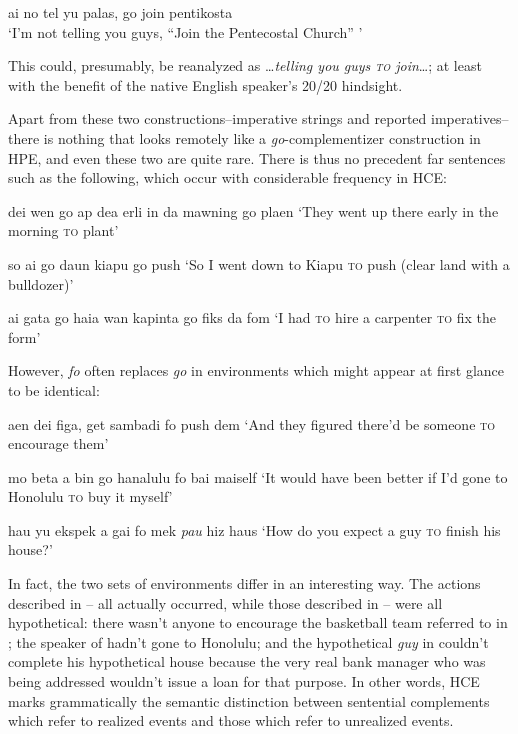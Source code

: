 \ea\label{ex:60}
 ai no tel yu palas, go join pentikosta\\
\glt `I'm not telling you guys, ``Join the Pentecostal Church'' '
\z

\noindent This could, presumably, be reanalyzed as \ldots \textit{telling you guys \textsc{to} join}\ldots; at least with the benefit of the native English speaker's 20/20 hindsight.

Apart from these two constructions--imperative strings and reported imperatives--there is nothing that looks remotely like a \textit{go}-complementizer construction in HPE, and even these two are quite rare. There is thus no precedent far sentences such as the following, which occur with considerable frequency in HCE:

\ea\label{ex:61}
 dei wen go ap dea erli in da mawning go plaen
\glt `They went up there early in the morning \textsc{to} plant'
\z

\ea\label{ex:62}
 so ai go daun kiapu go push
\glt `So I went down to Kiapu \textsc{to} push (clear land with a bulldozer)'
\z

\ea\label{ex:63}
 ai gata go haia wan kapinta go fiks da fom
\glt `I had \textsc{to} hire a carpenter \textsc{to} fix the form'
\z

However, \textit{fo} often replaces \textit{go} in environments which might appear at first glance to be identical:

\ea\label{ex:64}
 aen dei figa, get sambadi fo push dem
\glt `And they figured there'd be someone \textsc{to} encourage them'
\z

\ea\label{ex:65}
 mo beta a bin go hanalulu fo bai maiself
\glt `It would have been better if I'd gone to Honolulu \textsc{to} buy it myself' 
\z

\ea\label{ex:66}
 hau yu ekspek a gai fo mek \textit{pau} hiz haus
\glt `How do you expect a guy \textsc{to} finish his house?'
\z

\noindent In fact, the two sets of environments differ in an interesting way. The actions described in -- all actually occurred, while those de\-scribed in -- were all hypothetical: there wasn't anyone to encourage the basketball team referred to in ; the speaker of  hadn't gone to Honolulu; and the hypothetical \textit{guy} in  couldn't complete his hypothetical house because the very real bank manager who was being addressed wouldn't issue a loan for that purpose. In
other words, HCE marks grammatically the semantic distinction be\-tween sentential complements which refer to realized events and those which refer to unrealized events.

